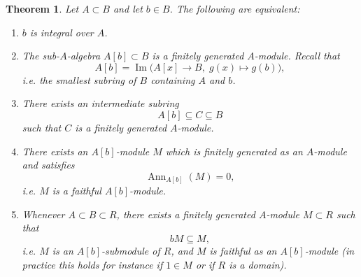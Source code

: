 \documentclass[11pt,a4paper]{article}
\theoremstyle{definition}
\theoremstyle{plain}
\newtheorem{theorem}[definition]{Theorem}
\theoremstyle{remark}
\newcommand{\Ann}{\operatorname{Ann}}
\begin{document}
\begin{theorem}
    Let $A \subset B$ and let $b \in B$. The following are equivalent:
    \begin{enumerate}
        \item $b$ is integral over $A$.
        
        \item The sub-$A$-algebra $A[b] \subset B$ is a finitely generated
        $A$-module. Recall that
        \[
        A[b] = \operatorname{Im}\!\big(A[x] \to B,\; g(x)\mapsto g(b)\big),
        \]
        i.e. the smallest subring of $B$ containing $A$ and $b$.
        
        \item There exists an intermediate subring
        \[
        A[b] \subseteq C \subseteq B
        \]
        such that $C$ is a finitely generated $A$-module.
        
        \item There exists an $A[b]$-module $M$ which is finitely generated
        as an $A$-module and satisfies
        \[
        \Ann_{A[b]}(M)=0,
        \]
        i.e. $M$ is a faithful $A[b]$-module.
        
        \item Whenever $A \subset B \subset R$, there exists a finitely
        generated $A$-module $M \subset R$ such that
        \[
        bM \subseteq M,
        \]
        i.e. $M$ is an $A[b]$-submodule of $R$, and $M$ is faithful as an
        $A[b]$-module (in practice this holds for instance if $1\in M$ or if
        $R$ is a domain).
    \end{enumerate}
\end{theorem}
\end{document}
